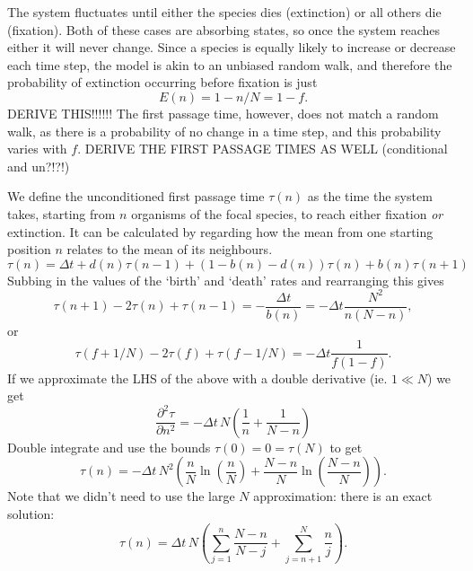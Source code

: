 The system fluctuates until either the species dies (extinction) or all others die (fixation).
Both of these cases are absorbing states, so once the system reaches either it will never change.
Since a species is equally likely to increase or decrease each time step, the model is akin to an unbiased random walk, and therefore the probability of extinction occurring before fixation is just
\begin{equation}
E(n) = 1-n/N = 1-f.
\end{equation}
DERIVE THIS!!!!!!
The first passage time, however, does not match a random walk, as there is a probability of no change in a time step, and this probability varies with $f$.
DERIVE THE FIRST PASSAGE TIMES AS WELL (conditional and un?!?!)

We define the unconditioned first passage time $\tau(n)$ as the time the system takes, starting from $n$ organisms of the focal species, to reach either fixation \emph{or} extinction.
It can be calculated by regarding how the mean from one starting position $n$ relates to the mean of its neighbours.
\begin{equation}
\tau(n) = \Delta t + d(n)\tau(n-1) + \left(1-b(n)-d(n)\right)\tau(n) + b(n)\tau(n+1)
\end{equation}
Subbing in the values of the `birth' and `death' rates and rearranging this gives
\begin{equation}
\tau(n+1) - 2\tau(n) + \tau(n-1) = -\frac{\Delta t}{b(n)} = -\Delta t\frac{N^2}{n(N-n)},
\end{equation}
or
\begin{equation}
\tau(f+1/N) - 2\tau(f) + \tau(f-1/N) = -\Delta t\frac{1}{f(1-f)}.
\end{equation}
If we approximate the LHS of the above with a double derivative (ie. $1\ll N$) we get
\begin{equation}
\frac{\partial^2\tau}{\partial n^2} = -\Delta t\,N\left(\frac{1}{n}+\frac{1}{N-n}\right)
\end{equation}
Double integrate and use the bounds $\tau(0) = 0 = \tau(N)$ to get
\begin{equation}
\tau(n) = -\Delta t\,N^2\left(\frac{n}{N}\ln\left(\frac{n}{N}\right)+\frac{N-n}{N}\ln\left(\frac{N-n}{N}\right)\right).
\end{equation}
Note that we didn't need to use the large $N$ approximation: there is an exact solution:
\begin{equation}
\tau(n) = \Delta t\,N\left(\sum_{j=1}^n\frac{N-n}{N-j} + \sum_{j=n+1}^N\frac{n}{j}\right).
\end{equation}



